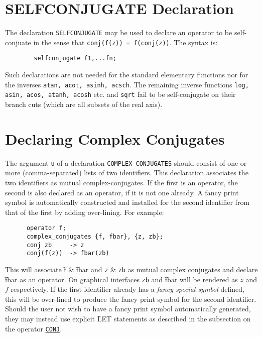 \section{SELFCONJUGATE Declaration}
\hypertarget{command:SELFCONJUGATE}{}

The declaration \texttt{SELFCONJUGATE} may be used 
to declare an operator to be self-conjuate in the sense that
\texttt{conj(f(z)) = f(conj(z))}. The syntax is:
\begin{verbatim}
        selfconjugate f1,...fn;
\end{verbatim}

Such declarations are not needed for the standard elementary functions nor
for the inverses \texttt{atan, acot, asinh, acsch}. The remaining inverse
functions \texttt{log, asin, acos, atanh, acosh} etc. and
\texttt{sqrt} fail to be self-conjugate on their branch cuts (which are all
subsets of the real axis).

\section{Declaring Complex Conjugates}
\hypertarget{command:COMPLEX_CONJUGATES}{}
The argument \texttt{u} of a declaration \texttt{COMPLEX\_CONJUGATES} should
consist of one or more (comma-separated) lists of two identifiers.
This declaration associates the two identifiers as
mutual complex-conjugates. If the first is an operator, the second is
also declared as an operator, if it is not one already. A fancy print symbol 
is automatically constructed and installed for the second identifier
from that of the first by adding over-lining. For example:
\begin{verbatim} 
      operator f;
      complex_conjugates {f, fbar}, {z, zb};
      conj zb     -> z
      conj(f(z))  -> fbar(zb)  
\end{verbatim}
This will associate \f{f} \& \f{fbar} and \texttt{z} \& \texttt{zb}
as mutual complex conjugates and declare \f{fbar} as an operator.
On graphical interfaces \texttt{zb} and \f{fbar} will be rendered as
$\overline{z}$ and $\overline{f}$ respectively. If the first identifier
already has a \emph{fancy special symbol} defined, this will be over-lined
to produce the fancy print symbol for the second identifier.
Should the user not wish to have a fancy print symbol automatically generated,
they may instead use explicit \f{LET} statements as described in the 
subsection on the operator \hyperlink{operator:CONJ}{\texttt{CONJ}}.

